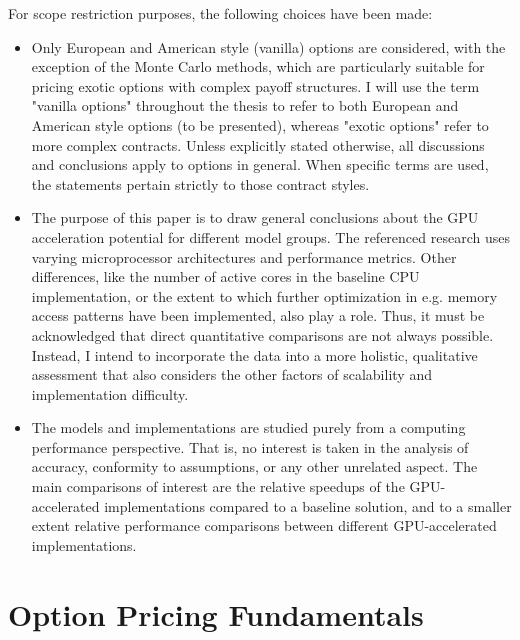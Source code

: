 \documentclass[english,12pt,a4paper,pdftex,sci,utf8]{aaltothesis}
\begin{document}
For scope restriction purposes, the following choices have been made:
\begin{itemize}
    \item Only European and American style (vanilla) options are considered, with the exception of the Monte Carlo methods, which are particularly suitable for pricing exotic options with complex payoff structures. I will use the term "vanilla options" throughout the thesis to refer to both European and American style options (to be presented), whereas "exotic options" refer to more complex contracts. Unless explicitly stated otherwise, all discussions and conclusions apply to options in general. When specific terms are used, the statements pertain strictly to those contract styles.
    
    \item The purpose of this paper is to draw general conclusions about the GPU acceleration potential for different model groups. The referenced research uses varying microprocessor architectures and performance metrics. Other differences, like the number of active cores in the baseline CPU implementation, or the extent to which further optimization in e.g. memory access patterns have been implemented, also play a role. Thus, it must be acknowledged that direct quantitative comparisons are not always possible. Instead, I intend to incorporate the data into a more holistic, qualitative assessment that also considers the other factors of scalability and implementation difficulty.

    \item The models and implementations are studied purely from a computing performance perspective. That is, no interest is taken in the analysis of accuracy, conformity to assumptions, or any other unrelated aspect. The main comparisons of interest are the relative speedups of the GPU-accelerated implementations compared to a baseline solution, and to a smaller extent relative performance comparisons between different GPU-accelerated implementations.
\end{itemize}


\clearpage

\section{Option Pricing Fundamentals} \label{sec:optionfundamentals}
\end{document}
